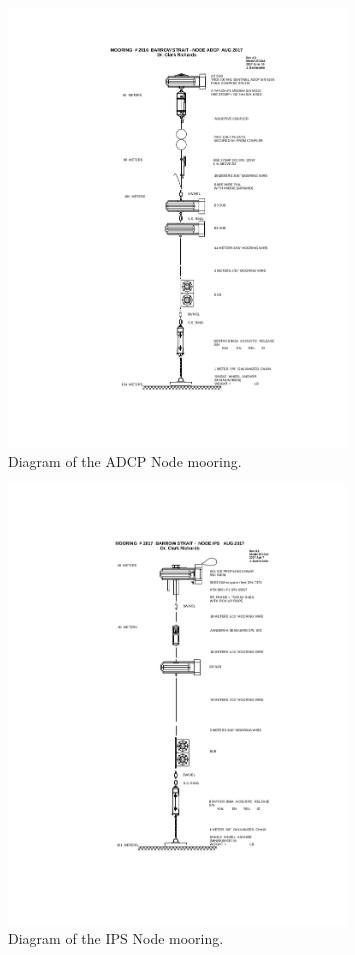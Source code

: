 \documentclass[12pt]{dforeport}
\begin{document}
\begin{figure}
\centering
\includegraphics[width = 0.8\textwidth]{./figures/ADCP.png}
\caption[Mooring Diagram: ADCP Node]{Diagram of the ADCP Node mooring.}
\label{f:md_adcp}
\end{figure}

\begin{figure}
\centering
\includegraphics[width = 0.8\textwidth]{./figures/IPS.png}
\caption[Mooring Diagram: IPS node]{Diagram of the IPS Node mooring.}
\label{f:md_ips}
\end{figure}
\end{document}
